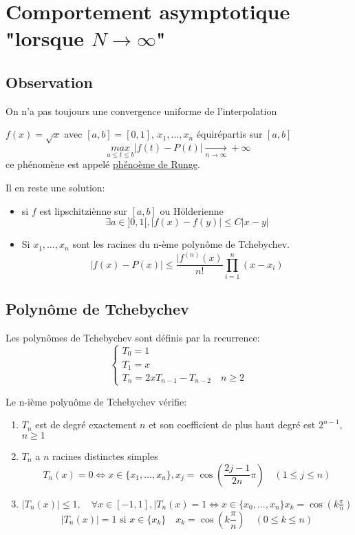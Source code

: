 \section{Comportement asymptotique "lorsque $N \to \infty$"}
\subsection{Observation}
On n'a pas toujours une convergence uniforme de l'interpolation
\begin{eg}
    $f(x) = \sqrt{x}$ avec $[a, b] = [0, 1]$,  $x_1, \ldots, x_n$ équirépartis sur $[a, b]$ 
    \[
        \underset{a \le t \le b}{max}|f(t) - P(t)| \xrightarrow[n \to \infty]{} +\infty
    \] 
    ce phénomène est appelé \underline{phénoème de Runge}.
\end{eg}

Il en reste une solution: 
\begin{itemize}
    \item si $f$ est lipschitziènne sur  $[a, b]$ ou Hölderienne 
         \[
             \exists a \in ]0, 1[, |f(x) - f(y)| \le C|x - y|
        \] 
    \item Si $x_1, \ldots, x_n$ sont les racines du n-ème polynôme de Tchebychev.
        \[
            |f(x) - P(x)| \le \frac{|f^{(n)}(x)}{n!}\prod_{i=1}^{n} (x - x_i)  
        \] 
\end{itemize}

\subsection{Polynôme de Tchebychev}
\begin{definition}
    Les polynômes de Tchebychev sont définis par la recurrence:
    \[
    \begin{cases}
        T_0 = 1\\
        T_1 = x\\
        T_n = 2xT_{n-1} - T_{n-2} \quad n\ge 2
    \end{cases}
    \] 
\end{definition}
\begin{prop}
   Le n-ième polynôme de Tchebychev vérifie:
   \begin{enumerate}
       \item $T_n$ est de degré exactement  $n$ et son coefficient de plus haut degré est  $2^{n-1}$,  $n \ge 1$
       \item $T_n$ a  $n$ racines distinctes simples
            \[
                T_n(x) = 0 \iff x \in \{x_1, \ldots, x_n\}, x_j = \cos( \frac{2j - 1}{2n} \pi)  \quad (1 \le j \le  n)
           \] 
       \item $|T_n(x)| \le 1, \quad \forall x \in [-1, 1], |T_n(x) = 1 \iff x \in \{x_0, \ldots, x_n\} x_k = \cos(k\frac{\pi}{n})$
           \[
               |T_n(x)| = 1 \text{ si } x \in \{x_k\} \quad x_k = \cos(k\frac{\pi}{n}) \quad (0 \le k \le n)
           \] 
   \end{enumerate}
\end{prop}

